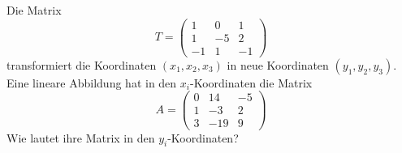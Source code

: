 %
%
%
%
%
Die Matrix
\[
T=
\begin{pmatrix}
   1&  0&  1\\
   1& -5&  2\\
  -1&  1& -1
\end{pmatrix}
\]
transformiert die Koordinaten $(x_1,x_2,x_3)$ in neue Koordinaten $(y_1,y_2,y_3)$.
Eine lineare Abbildung hat in den $x_i$-Koordinaten die Matrix
\[
A=
\begin{pmatrix}
    0&  14&  -5\\
    1&  -3&   2\\
    3& -19&   9
\end{pmatrix}
\]
Wie lautet ihre Matrix in den $y_i$-Koordinaten?


